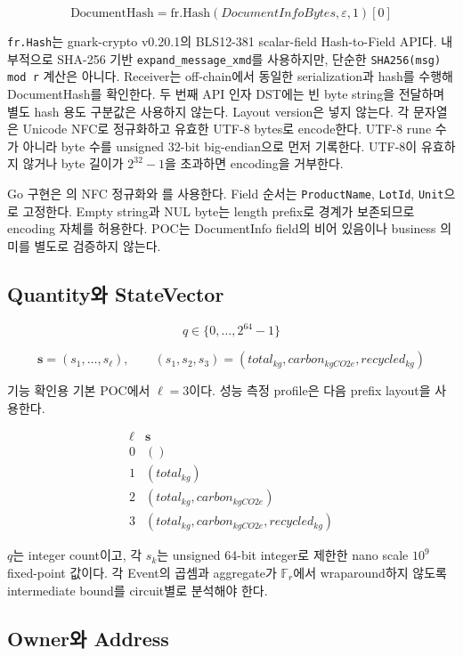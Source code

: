 \documentclass[11pt,a4paper]{extarticle}
\newcommand{\DocumentHash}{\mathrm{DocumentHash}}
\begin{document}
\[
\DocumentHash=\mathrm{fr.Hash}(
\mathit{DocumentInfoBytes},
\varepsilon,1
)[0]
\]

\texttt{fr.Hash}는 gnark-crypto v0.20.1의 BLS12-381 scalar-field
Hash-to-Field API다. 내부적으로 SHA-256 기반 \texttt{expand\_message\_xmd}를
사용하지만, 단순한 \texttt{SHA256(msg) mod r} 계산은 아니다. Receiver는
off-chain에서 동일한 serialization과 hash를 수행해 DocumentHash를 확인한다.
두 번째 API 인자 DST에는 빈 byte string을 전달하며 별도 hash 용도 구분값은
사용하지 않는다. Layout version은 넣지 않는다. 각 문자열은 Unicode NFC로 정규화하고
유효한 UTF-8 bytes로 encode한다. UTF-8 rune 수가 아니라 byte 수를 unsigned 32-bit
big-endian으로 먼저 기록한다. UTF-8이 유효하지 않거나 byte 길이가 $2^{32}-1$을
초과하면 encoding을 거부한다.

Go 구현은 의 NFC 정규화와
를 사용한다. Field 순서는
\texttt{ProductName}, \texttt{LotId}, \texttt{Unit}으로 고정한다. Empty string과
NUL byte는 length prefix로 경계가 보존되므로 encoding 자체를 허용한다. POC는
DocumentInfo field의 비어 있음이나 business 의미를 별도로 검증하지 않는다.

\subsection{Quantity와 StateVector}

\[
q\in\{0,\ldots,2^{64}-1\}
\]

\[
\mathbf{s}=(s_1,\ldots,s_{\ell}),
\qquad
(s_1,s_2,s_3)=(total_{kg},carbon_{kgCO2e},recycled_{kg})
\]

기능 확인용 기본 POC에서 $\ell=3$이다. 성능 측정 profile은 다음 prefix layout을 사용한다.

\[
\begin{array}{c|l}
\ell & \mathbf{s} \\
\hline
0 & () \\
1 & (total_{kg}) \\
2 & (total_{kg},carbon_{kgCO2e}) \\
3 & (total_{kg},carbon_{kgCO2e},recycled_{kg})
\end{array}
\]

$q$는 integer count이고, 각 $s_k$는 unsigned 64-bit
integer로 제한한 nano scale $10^9$ fixed-point 값이다. 각 Event의 곱셈과 aggregate가
$\mathbb{F}_r$에서 wraparound하지 않도록 intermediate bound를 circuit별로 분석해야 한다.

\subsection{Owner와 Address}
\end{document}
